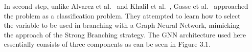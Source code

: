 In second step, unlike Alvarez et al.~\cite{alvarezMachineLearningBasedApproximation2017} and Khalil et al.~\cite{khalilLearningBranchMixed2016}, Gasse et al.~\cite{gasseExactCombinatorialOptimization2019} approached the problem as a classification problem.
They attempted to learn how to select the variable to be used in branching with a Graph Neural Network, mimicking the approach of the Strong Branching strategy.
The GNN architecture used here essentially consists of three components as can be seen in Figure 3.1.